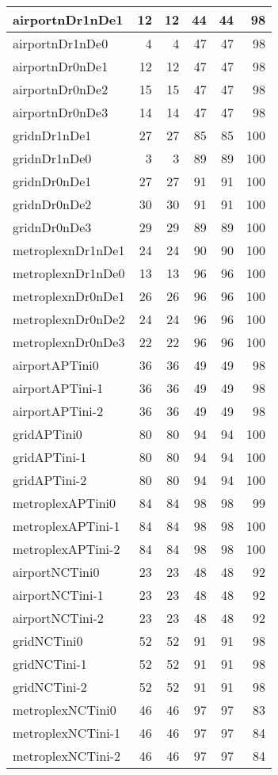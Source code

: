 \begin{longtable}{|l|r|r|r|r|r|}
\endlastfoot
airportnDr1nDe1 & 12 & 12 & 44 & 44 & 98 \\ \hline
airportnDr1nDe0 & 4 & 4 & 47 & 47 & 98 \\ \hline
airportnDr0nDe1 & 12 & 12 & 47 & 47 & 98 \\ \hline
airportnDr0nDe2 & 15 & 15 & 47 & 47 & 98 \\ \hline
airportnDr0nDe3 & 14 & 14 & 47 & 47 & 98 \\ \hline
gridnDr1nDe1 & 27 & 27 & 85 & 85 & 100 \\ \hline
gridnDr1nDe0 & 3 & 3 & 89 & 89 & 100 \\ \hline
gridnDr0nDe1 & 27 & 27 & 91 & 91 & 100 \\ \hline
gridnDr0nDe2 & 30 & 30 & 91 & 91 & 100 \\ \hline
gridnDr0nDe3 & 29 & 29 & 89 & 89 & 100 \\ \hline
metroplexnDr1nDe1 & 24 & 24 & 90 & 90 & 100 \\ \hline
metroplexnDr1nDe0 & 13 & 13 & 96 & 96 & 100 \\ \hline
metroplexnDr0nDe1 & 26 & 26 & 96 & 96 & 100 \\ \hline
metroplexnDr0nDe2 & 24 & 24 & 96 & 96 & 100 \\ \hline
metroplexnDr0nDe3 & 22 & 22 & 96 & 96 & 100 \\ \hline
airportAPTini0 & 36 & 36 & 49 & 49 & 98 \\ \hline
airportAPTini-1 & 36 & 36 & 49 & 49 & 98 \\ \hline
airportAPTini-2 & 36 & 36 & 49 & 49 & 98 \\ \hline
gridAPTini0 & 80 & 80 & 94 & 94 & 100 \\ \hline
gridAPTini-1 & 80 & 80 & 94 & 94 & 100 \\ \hline
gridAPTini-2 & 80 & 80 & 94 & 94 & 100 \\ \hline
metroplexAPTini0 & 84 & 84 & 98 & 98 & 99 \\ \hline
metroplexAPTini-1 & 84 & 84 & 98 & 98 & 100 \\ \hline
metroplexAPTini-2 & 84 & 84 & 98 & 98 & 100 \\ \hline
airportNCTini0 & 23 & 23 & 48 & 48 & 92 \\ \hline
airportNCTini-1 & 23 & 23 & 48 & 48 & 92 \\ \hline
airportNCTini-2 & 23 & 23 & 48 & 48 & 92 \\ \hline
gridNCTini0 & 52 & 52 & 91 & 91 & 98 \\ \hline
gridNCTini-1 & 52 & 52 & 91 & 91 & 98 \\ \hline
gridNCTini-2 & 52 & 52 & 91 & 91 & 98 \\ \hline
metroplexNCTini0 & 46 & 46 & 97 & 97 & 83 \\ \hline
metroplexNCTini-1 & 46 & 46 & 97 & 97 & 84 \\ \hline
metroplexNCTini-2 & 46 & 46 & 97 & 97 & 84 \\ \hline
\end{longtable}
